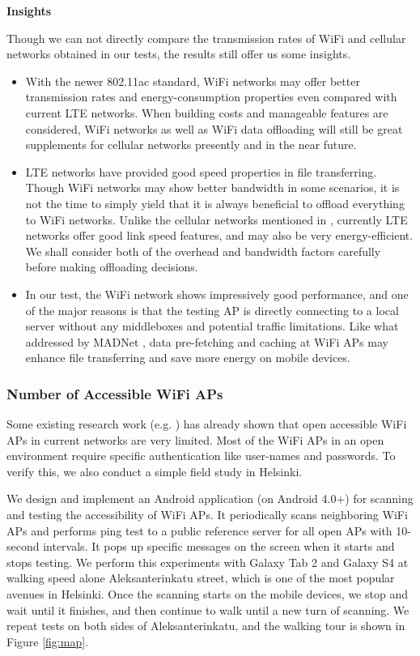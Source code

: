 \documentclass[english]{tktltiki}
\begin{document}
\vspace{1mm}

\textbf{Insights}

\vspace{1mm}

Though we can not directly compare the transmission rates of WiFi and cellular networks obtained in our tests, the results still offer us some insights.

\begin{itemize}
  \item With the newer 802.11ac standard, WiFi networks may offer better transmission rates and energy-consumption properties even compared with current LTE networks. When building costs and manageable features are considered, WiFi networks as well as WiFi data offloading will still be great supplements for cellular networks presently and in the near future.
  \item LTE networks have provided good speed properties in file transferring. Though WiFi networks may show better bandwidth in some scenarios, it is not the time to simply yield that it is always beneficial to offload everything to WiFi networks. Unlike the cellular networks mentioned in \cite{bmv10}, currently LTE networks offer good link speed features, and may also be very energy-efficient. We shall consider both of the overhead and bandwidth factors carefully before making offloading decisions.
  \item In our test, the WiFi network shows impressively good performance, and one of the major reasons is that the testing AP is directly connecting to a local server without any middleboxes and potential traffic limitations. Like what addressed by MADNet \cite{dhx+13}, data pre-fetching and caching at WiFi APs may enhance file transferring and save more energy on mobile devices.
\end{itemize}


\subsubsection{Number of Accessible WiFi APs}

Some existing research work (e.g. \cite{dhx+13}) has already shown that open accessible WiFi APs in current networks are very limited. Most of the WiFi APs in an open environment require specific authentication like user-names and passwords. To verify this, we also conduct a simple field study in Helsinki. 

We design and implement an Android application (on Android 4.0+) for scanning and testing the accessibility of WiFi APs. It periodically scans neighboring WiFi APs and performs ping test to a public reference server for all open APs with 10-second intervals. It pops up specific messages on the screen when it starts and stops testing. We perform this experiments with Galaxy Tab 2 and Galaxy S4 at walking speed alone Aleksanterinkatu street, which is one of the most popular avenues in Helsinki. Once the scanning starts on the mobile devices, we stop and wait until it finishes, and then continue to walk until a new turn of scanning. We repeat tests on both sides of Aleksanterinkatu, and the walking tour is shown in Figure \ref{fig:map}.
\end{document}
